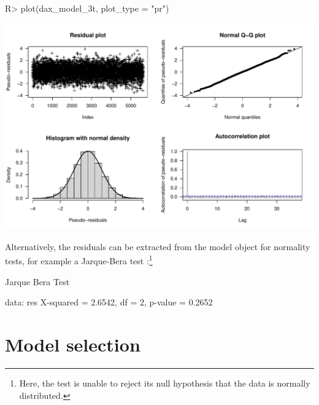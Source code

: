 \documentclass[article]{jss}
\begin{document}
%
\begin{Schunk}
\begin{Sinput}
R> plot(dax_model_3t, plot_type = "pr")
\end{Sinput}
\end{Schunk}
\includegraphics{fhmm_oelschlaeger_adam_michels-dax-res}
%

Alternatively, the residuals can be extracted from the model object for normality tests, for example a Jarque-Bera test \citep{jar87}:\footnote{Here, the test is unable to reject its null hypothesis that the data is normally distributed.}

%
\begin{Schunk}
\begin{Soutput}
	Jarque Bera Test

data:  res
X-squared = 2.6542, df = 2, p-value = 0.2652
\end{Soutput}
\end{Schunk}
%

\section{Model selection} \label{sec:model_selection} %
\end{document}
